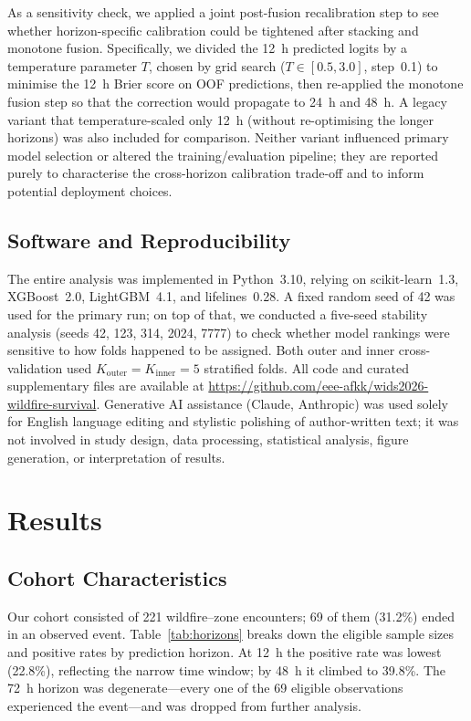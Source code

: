\documentclass[fire,article,submit,pdftex]{../Definitions/mdpi}
\begin{document}
As a sensitivity check, we applied a joint post-fusion recalibration step to see whether horizon-specific calibration could be tightened after stacking and monotone fusion.
Specifically, we divided the 12~h predicted logits by a temperature parameter $T$, chosen by grid search ($T \in [0.5, 3.0]$, step~0.1) to minimise the 12~h Brier score on OOF predictions, then re-applied the monotone fusion step so that the correction would propagate to 24~h and 48~h.
A legacy variant that temperature-scaled only 12~h (without re-optimising the longer horizons) was also included for comparison.
Neither variant influenced primary model selection or altered the training/evaluation pipeline; they are reported purely to characterise the cross-horizon calibration trade-off and to inform potential deployment choices.

\subsection{Software and Reproducibility}\label{sec:software}

The entire analysis was implemented in Python~3.10, relying on scikit-learn~1.3, XGBoost~2.0, LightGBM~4.1, and lifelines~0.28.
A fixed random seed of 42 was used for the primary run; on top of that, we conducted a five-seed stability analysis (seeds 42, 123, 314, 2024, 7777) to check whether model rankings were sensitive to how folds happened to be assigned.
Both outer and inner cross-validation used $K_{\text{outer}} = K_{\text{inner}} = 5$ stratified folds.
All code and curated supplementary files are available at \url{https://github.com/eee-afkk/wids2026-wildfire-survival}.
Generative AI assistance (Claude, Anthropic) was used solely for English language editing and stylistic polishing of author-written text; it was not involved in study design, data processing, statistical analysis, figure generation, or interpretation of results.

\section{Results}\label{sec:results}

\subsection{Cohort Characteristics}\label{sec:cohort}

Our cohort consisted of 221 wildfire--zone encounters; 69 of them (31.2\%) ended in an observed event.
Table~\ref{tab:horizons} breaks down the eligible sample sizes and positive rates by prediction horizon.
At 12~h the positive rate was lowest (22.8\%), reflecting the narrow time window; by 48~h it climbed to 39.8\%.
The 72~h horizon was degenerate---every one of the 69 eligible observations experienced the event---and was dropped from further analysis.
\end{document}

